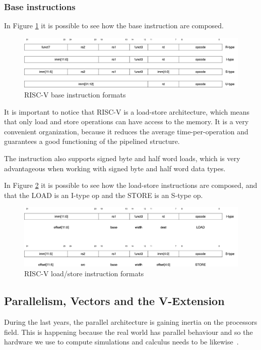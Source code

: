 \subsubsection{Base instructions}
In Figure \ref{riscv-base-instruction-formats} it is possible to see how the base instruction are composed.

\begin{figure}[H]
    \centering
    \includegraphics[scale = 0.27]{Chapter_1/img/riscv-base-instruction-formats.png}
    \caption{RISC-V base instruction formats~\cite{RISC-V-Instruction-Set-Manual}}
    \label{riscv-base-instruction-formats}
\end{figure}

It is important to notice that RISC-V is a load-store architecture, which means that only load and store operations can have access to the memory.
It is a very convenient organization, because it reduces the average time-per-operation and guarantees a good functioning of the pipelined structure.

The instruction also supports signed byte and half word loads, which is very advantageous when working with signed byte and half word data types.

In Figure \ref{riscv-load-store} it is possible to see how the load-store instructions are composed, and that the LOAD is an I-type op and the STORE is an S-type op.

\begin{figure}[H]
    \centering
    \includegraphics[scale = 0.27]{Chapter_1/img/riscv-load-store.png}
    \caption{RISC-V load/store instruction formats~\cite{RISC-V-Instruction-Set-Manual}}
    \label{riscv-load-store}
\end{figure}


\subsection{Parallelism, Vectors and the V-Extension}
During the last years, the parallel architecture is gaining inertia on the processors field. This is happening because the real world has parallel behaviour and so the hardware we use to compute simulations and calculus needs to be likewise~\cite{Parallel-Computing}.

